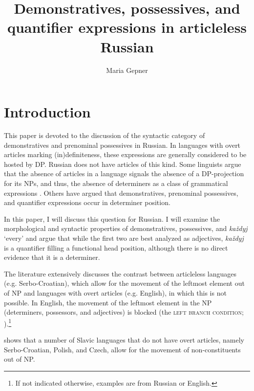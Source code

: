 \documentclass[output=paper,
colorlinks,
citecolor=brown,
newtxmath
]{langscibook}
\author{Maria Gepner\affiliation{Bar Ilan University}}
\title[Demonstratives, possessives, and quantifier expressions]
      {Demonstratives, possessives, and quantifier expressions in articleless Russian}
\begin{document}
\maketitle

\section{Introduction}\label{introduction}
This paper is devoted to the discussion of the syntactic category of demonstratives and prenominal possessives in Russian. In languages with overt articles marking (in)definiteness, these expressions are generally considered to be hosted by DP. Russian does not have articles of this kind. Some linguists argue that the absence of articles in a language signals the absence of a DP-projection for its NPs, and thus, the absence of determiners as a class of grammatical expressions \citep{Boskovic2005a,Boskovic2007,Boskovic2009,Boskovic2010}. Others \citep{Engelhardt.Trugman1998,Rappaport2002,Franks.Pereltsvaig2004,Trugman2005,Trugman2007,Pereltsvaig2007} have argued that demonstratives, prenominal possessives, and quantifier expressions occur in determiner position.

In this paper, I will discuss this question for Russian. I will examine the morphological and syntactic properties of demonstratives, possessives, and \textit{každyj} `every' and argue that while the first two are best analyzed as adjectives, \textit{každyj} is a quantifier filling a functional head position, although there is no direct evidence that it is a determiner.

The literature extensively discusses the contrast between articleless languages (e.g. Serbo-Croatian), which allow for the movement of the leftmost element out of NP and languages with overt articles (e.g. English), in which this is not possible. In English, the movement of the leftmost element in the NP (determiners, possessors, and adjectives) is blocked (the \textsc{left branch condition}; \citealt{Ross1986}).\footnote{If not indicated otherwise, examples are from Russian or English.} 


\ea\label{whosefather}
\z\z

\noindent \citet{Boskovic2005a} shows that a number of Slavic languages that do not have overt articles, namely Serbo-Croatian, Polish, and Czech, allow for the movement of non-constituents out of NP.
\end{document}

